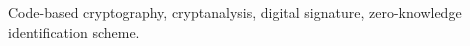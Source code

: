 \begin{IEEEkeywords}
        Code-based cryptography, cryptanalysis, digital signature, zero-knowledge identification scheme.
\end{IEEEkeywords}